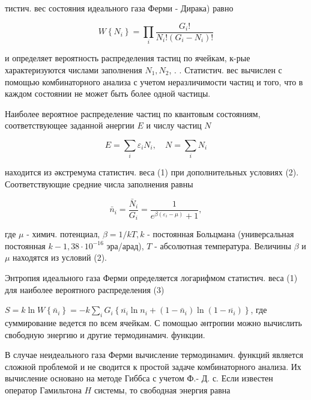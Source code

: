 \documentclass[10pt]{article}
\begin{document}
тистич. вес состояния идеального газа Ферми - Дирака) равно



\[

W\left\{N_{i}\right\}=\prod_{i} \frac{G_{i} !}{N_{i} !\left(G_{i}-N_{i}\right) !}

\]



и определяет вероятность распределения тастиц по ячейкам, к-рые характеризуются числами заполнения $N_{1}, N_{2}$, . . Статистич. вес вычислен с помощью комбинаторного анализа с учетом неразличимости частиц и того, что в каждом состоянии не может быть более одной частицы.



Наиболее вероятное распределение частиц по квантовым состояниям, соответствующее заданной әнергии $E$ и числу частиц $N$



\[

E=\sum_{i} \varepsilon_{i} N_{i}, \quad N=\sum_{i} N_{i}

\]



находится из әкстремума статистич. веса (1) при дополнительных условиях (2). Соответствующие средние числа заполнения равны



\[

\bar{n}_{i}=\frac{\bar{N}_{i}}{G_{i}}=\frac{1}{e^{\beta\left(\varepsilon_{i}-\mu\right)}+1},

\]



где $\mu$ - химич. потенциал, $\beta=1 / k T, k$ - постоянная Больцмана (универсальная постоянная $k-1,38 \cdot 10^{-16}$ эра/арад), $T$ - абсолютная температура. Величины $\beta$ и $\mu$ находятся из условий (2).



Энтропия идеального газа Ферми определяется логарифмом статистич. веса (1) для наиболее вероятного распределения (3)



$S=k \ln W\left\{\bar{n}_{i}\right\}=-k \sum_{i} G_{i}\left\{\overline{n_{i}} \ln n_{i}+\left(1-\bar{n}_{i}\right) \ln \left(1-\overline{n_{i}}\right)\right\}$, где суммирование ведется по всем ячейкам. С помощью әнтропии можно вычислить свободную энергию и другие термодинамич. функции.



В случае неидеального газа Ферми вычисление термодинамич. функций является сложной проблемой и не сводится к простой задаче комбинаторного анализа. Их вычисление основано на методе Гиббса с учетом Ф.- Д. с. Если известен оператор Гамильтона $H$ системы, то свободная энергия равна
\end{document}
